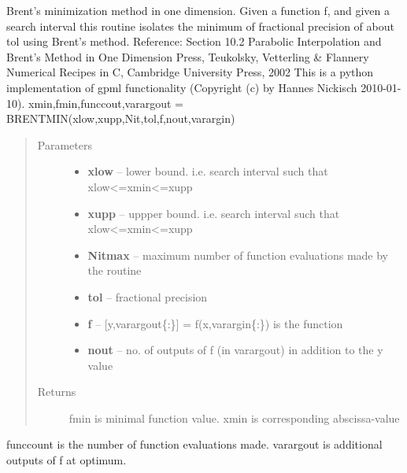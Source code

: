 \documentclass[letterpaper,10pt,english]{sphinxmanual}
\begin{document}
\begin{fulllineitems}
\label{pyGPs.Core:pyGPs.Core.tools.brentmin}
Brent's minimization method in one dimension. 
Given a function f, and given a search interval this routine isolates 
the minimum of fractional precision of about tol using Brent's method.
Reference: Section 10.2 Parabolic Interpolation and Brent's Method in One Dimension
Press, Teukolsky, Vetterling \& Flannery
Numerical Recipes in C, Cambridge University Press, 2002
This is a python implementation of gpml functionality (Copyright (c) by
Hannes Nickisch 2010-01-10). 
xmin,fmin,funccout,varargout = BRENTMIN(xlow,xupp,Nit,tol,f,nout,varargin)
\begin{quote}\begin{description}
\item[{Parameters}] \leavevmode\begin{itemize}
\item {} 
\textbf{xlow} -- lower bound. i.e. search interval such that xlow\textless{}=xmin\textless{}=xupp

\item {} 
\textbf{xupp} -- uppper bound. i.e. search interval such that xlow\textless{}=xmin\textless{}=xupp

\item {} 
\textbf{Nitmax} -- maximum number of function evaluations made by the routine

\item {} 
\textbf{tol} -- fractional precision

\item {} 
\textbf{f} -- {[}y,varargout\{:\}{]} = f(x,varargin\{:\}) is the function

\item {} 
\textbf{nout} -- no. of outputs of f (in varargout) in addition to the y value

\end{itemize}

\item[{Returns}] \leavevmode
fmin is minimal function value. xmin is corresponding abscissa-value

\end{description}\end{quote}

funccount is the number of function evaluations made. varargout is additional outputs of f at optimum.

\end{fulllineitems}
\end{document}
